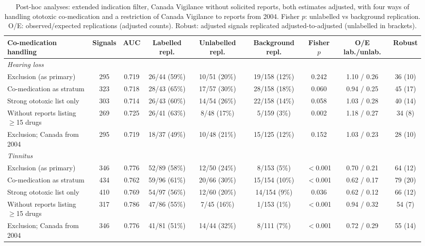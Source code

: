 \documentclass[11pt]{article}
\begin{document}
\begin{table}[t]
\centering\small
\caption{Post-hoc analyses: extended indication filter, Canada Vigilance without solicited reports, both estimates adjusted,
with four ways of handling ototoxic co-medication and a restriction of Canada Vigilance to reports from 2004. Fisher $p$:
unlabelled vs background replication. O/E: observed/expected replications (adjusted counts). Robust: adjusted signals replicated
adjusted-to-adjusted (unlabelled in brackets).}
\label{tab:posthoc}
\begin{tabular}{lcccccccc}
\toprule
Co-medication handling & Signals & AUC & Labelled repl. & Unlabelled repl. & Background repl. & Fisher $p$ & O/E lab./unlab. & Robust \\
\midrule
\multicolumn{9}{l}{\textit{Hearing loss}} \\
Exclusion (as primary) & 295 & 0.719 & 26/44 (59\%) & 10/51 (20\%) & 19/158 (12\%) & 0.242 & 1.10 / 0.26 & 36 (10) \\
Co-medication as stratum & 323 & 0.718 & 28/43 (65\%) & 17/57 (30\%) & 28/158 (18\%) & 0.060 & 0.94 / 0.25 & 45 (17) \\
Strong ototoxic list only & 303 & 0.714 & 26/43 (60\%) & 14/54 (26\%) & 22/158 (14\%) & 0.058 & 1.03 / 0.28 & 40 (14) \\
Without reports listing $\geq$15 drugs & 269 & 0.725 & 26/41 (63\%) & 8/48 (17\%) & 5/159 (3\%) & 0.002 & 1.18 / 0.27 & 34 (8) \\
Exclusion; Canada from 2004 & 295 & 0.719 & 18/37 (49\%) & 10/48 (21\%) & 15/125 (12\%) & 0.152 & 1.03 / 0.23 & 28 (10) \\
\midrule
\multicolumn{9}{l}{\textit{Tinnitus}} \\
Exclusion (as primary) & 346 & 0.776 & 52/89 (58\%) & 12/50 (24\%) & 8/153 (5\%) & $<$0.001 & 0.70 / 0.21 & 64 (12) \\
Co-medication as stratum & 434 & 0.762 & 59/96 (61\%) & 20/66 (30\%) & 15/154 (10\%) & $<$0.001 & 0.62 / 0.17 & 79 (20) \\
Strong ototoxic list only & 410 & 0.769 & 54/97 (56\%) & 12/60 (20\%) & 14/154 (9\%) & 0.036 & 0.62 / 0.12 & 66 (12) \\
Without reports listing $\geq$15 drugs & 317 & 0.786 & 47/86 (55\%) & 7/45 (16\%) & 1/153 (1\%) & $<$0.001 & 0.94 / 0.32 & 54 (7) \\
Exclusion; Canada from 2004 & 346 & 0.776 & 41/81 (51\%) & 14/44 (32\%) & 8/111 (7\%) & $<$0.001 & 0.72 / 0.29 & 55 (14) \\
\bottomrule
\end{tabular}
\end{table}
\end{document}
